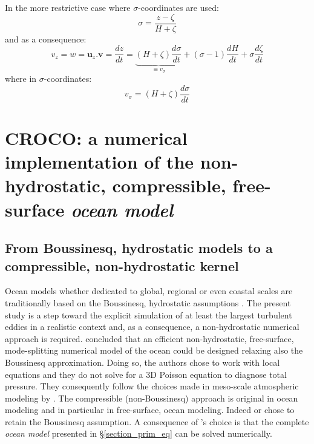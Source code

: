 In the more restrictive case where $\sigma$-coordinates are used:
\begin{equation}
 \displaystyle
 \sigma=\frac{z-\zeta}{H+\zeta}
\end{equation}
and as a consequence:
\begin{equation}
 \displaystyle
 v_z=w=\mathbf{u}_z.\mathbf{v}
=\frac{dz}{dt}=\underbrace{(H+\zeta)\frac{d\sigma}{dt}}_{\equiv v_{\sigma}}
 +(\sigma-1)\frac{dH}{dt}
 +\sigma\frac{d\zeta}{dt}
\end{equation}
where in $\sigma$-coordinates:
\begin{equation}
 \displaystyle
v_{\sigma}=(H+\zeta)\frac{d\sigma}{dt}
\end{equation}

 \section{CROCO: a numerical implementation of the non-hydrostatic, compressible, free-surface \textit{ocean model}}
 \label{section_croco}
 
\subsection{From Boussinesq, hydrostatic models to a compressible, non-hydrostatic kernel}
Ocean models whether dedicated to global, regional or even coastal scales are traditionally based on the Boussinesq, hydrostatic assumptions \citep{griffies_elements_2012,shchepetkin_regional_2005}. The present study is a step toward the explicit simulation of at least the largest turbulent eddies in a realistic context and, as a consequence, a non-hydrostatic numerical approach is required. \cite{Auclair2018} concluded that an efficient non-hydrostatic, free-surface, mode-splitting numerical model of the ocean could be designed relaxing also the Boussinesq approximation. Doing so, the authors chose to work with local equations and they do not solve for a 3D Poisson equation to diagnose total pressure. They consequently follow the choices made in meso-scale atmospheric modeling by \cite{skamarock_prototypes_2001}. The compressible (non-Boussinesq) approach is original in ocean modeling and in particular in free-surface, ocean modeling. Indeed \cite{marshall_finite-volume_1997} or \cite{auclair_non-hydrostatic_2011} chose to retain the Boussinesq assumption. A consequence of \cite{Auclair2018}'s choice is that the complete \textit{ocean model} presented in \S\ref{section_prim_eq} can be solved numerically.


